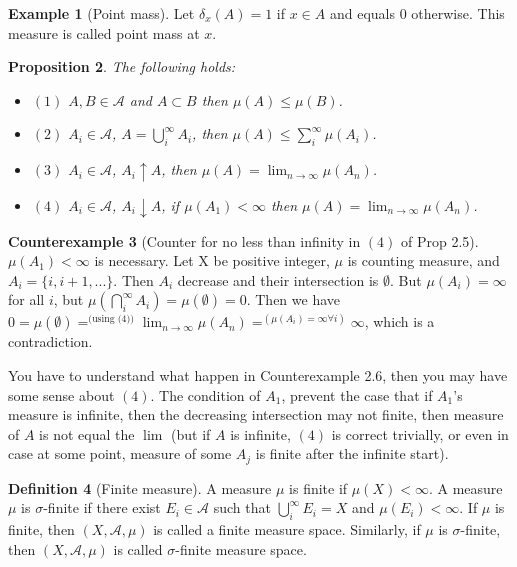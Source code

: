 \documentclass[11pt,a4paper]{article}
\theoremstyle{definition}
\newtheorem{definition}{Definition}[section]
\newtheorem{example}[definition]{Example}
\newtheorem{counterexample}[definition]{Counterexample}
\theoremstyle{plain}
\newtheorem{proposition}[definition]{Proposition}
\newcommand{\A}{\mathcal{A}}
\begin{document}
\begin{example}[Point mass]
Let $\delta_x(A) = 1$ if $x \in A$ and equals 0 otherwise. This measure is called point mass at $x$.
\end{example}

\begin{proposition}
The following holds:
\begin{itemize}
    \item $(1)$ $A,B\in \A$ and $A\subset B$ then $\mu(A) \le \mu(B)$.
    \item $(2)$ $A_i \in \A$, $A = \bigcup_i^{\infty}A_i$, then $\mu(A) \le \sum_i^{\infty}\mu(A_i)$.
    \item $(3)$ $A_i \in \A$, $A_i \uparrow A$, then $\mu(A) = \lim_{n\rightarrow \infty}\mu(A_n)$.
    \item $(4)$ $A_i \in \A$, $A_i \downarrow A$, if $\mu(A_1) < \infty$ then $\mu(A) = \lim_{n\rightarrow \infty}\mu(A_n)$.
\end{itemize}
\end{proposition}

\begin{counterexample}[Counter for no less than infinity in $(4)$ of Prop 2.5]
$\mu(A_1) < \infty$ is necessary. Let X be positive integer, $\mu$ is counting measure, and $A_i = \{i, i+1,...\}$. Then $A_i$ decrease and their intersection is $\emptyset$. But $\mu(A_i) = \infty$ for all $i$, but $\mu(\bigcap_i^{\infty}A_i) = \mu(\emptyset) = 0$. Then we have $0 = \mu(\emptyset) =^{\text{(using (4))}} \lim_{n\rightarrow\infty}\mu(A_n) =^{(\mu(A_i) = \infty \forall i)} \infty$, which is a contradiction.
\end{counterexample}

\begin{mynote}
You have to understand what happen in Counterexample 2.6, then you may have some sense about $(4)$. The condition of $A_1$, prevent the case that if $A_1$'s measure is infinite, then the decreasing intersection may not finite, then measure of $A$ is not equal the $\lim$ (but if $A$ is infinite, $(4)$ is correct trivially, or even in case at some point, measure of some $A_j$ is finite after the infinite start).
\end{mynote}

\begin{definition}[Finite measure]

A measure $\mu$ is finite if $\mu(X) < \infty$. A measure $\mu$ is $\sigma$-finite if there exist $E_i \in \A$ such that $\bigcup_i^{\infty}E_i = X$ and $\mu(E_i) < \infty$. If $\mu$ is finite, then $(X, \A, \mu)$ is called a finite measure space. Similarly, if $\mu$ is $\sigma$-finite, then $(X, \A, \mu)$ is called $\sigma$-finite measure space.
\end{definition}
\end{document}
